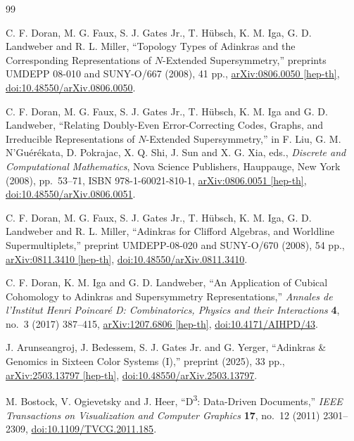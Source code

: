 \documentclass[11pt]{article}
\begin{document}
\begin{thebibliography}{99}
\small
\setlength{\itemsep}{0.45\baselineskip}

C. F. Doran, M. G. Faux, S. J. Gates Jr., T. H\"ubsch, K. M. Iga,
G. D. Landweber and R. L. Miller,
``Topology Types of Adinkras and the Corresponding Representations of
$N$-Extended Supersymmetry,''
preprints UMDEPP 08-010 and SUNY-O/667 (2008), 41 pp.,
\href{https://arxiv.org/abs/0806.0050}{arXiv:0806.0050 [hep-th]},
\href{https://doi.org/10.48550/arXiv.0806.0050}{doi:10.48550/arXiv.0806.0050}.

C. F. Doran, M. G. Faux, S. J. Gates Jr., T. H\"ubsch, K. M. Iga and
G. D. Landweber,
``Relating Doubly-Even Error-Correcting Codes, Graphs, and Irreducible
Representations of $N$-Extended Supersymmetry,''
in F. Liu, G. M. N'Gu\'er\'ekata, D. Pokrajac, X. Q. Shi, J. Sun and X. G. Xia,
eds., \emph{Discrete and Computational Mathematics}, Nova Science Publishers,
Hauppauge, New York (2008), pp.~53--71, ISBN 978-1-60021-810-1,
\href{https://arxiv.org/abs/0806.0051}{arXiv:0806.0051 [hep-th]},
\href{https://doi.org/10.48550/arXiv.0806.0051}{doi:10.48550/arXiv.0806.0051}.

C. F. Doran, M. G. Faux, S. J. Gates Jr., T. H\"ubsch, K. M. Iga,
G. D. Landweber and R. L. Miller,
``Adinkras for Clifford Algebras, and Worldline Supermultiplets,''
preprint UMDEPP-08-020 and SUNY-O/670 (2008), 54 pp.,
\href{https://arxiv.org/abs/0811.3410}{arXiv:0811.3410 [hep-th]},
\href{https://doi.org/10.48550/arXiv.0811.3410}{doi:10.48550/arXiv.0811.3410}.

C. F. Doran, K. M. Iga and G. D. Landweber,
``An Application of Cubical Cohomology to Adinkras and Supersymmetry
Representations,''
\emph{Annales de l'Institut Henri Poincar\'e D: Combinatorics, Physics and their
Interactions} \textbf{4}, no.~3 (2017) 387--415,
\href{https://arxiv.org/abs/1207.6806}{arXiv:1207.6806 [hep-th]},
\href{https://doi.org/10.4171/AIHPD/43}{doi:10.4171/AIHPD/43}.

J. Arunseangroj, J. Bedessem, S. J. Gates Jr. and G. Yerger,
``Adinkras \& Genomics in Sixteen Color Systems (I),''
preprint (2025), 33 pp.,
\href{https://arxiv.org/abs/2503.13797}{arXiv:2503.13797 [hep-th]},
\href{https://doi.org/10.48550/arXiv.2503.13797}{doi:10.48550/arXiv.2503.13797}.

M. Bostock, V. Ogievetsky and J. Heer,
``D\textsuperscript{3}: Data-Driven Documents,''
\emph{IEEE Transactions on Visualization and Computer Graphics} \textbf{17},
no.~12 (2011) 2301--2309,
\href{https://doi.org/10.1109/TVCG.2011.185}{doi:10.1109/TVCG.2011.185}.


\end{thebibliography}
\end{document}
